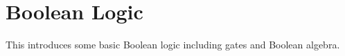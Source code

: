 \chapter{Boolean Logic}

This introduces some basic Boolean logic including gates and Boolean algebra.